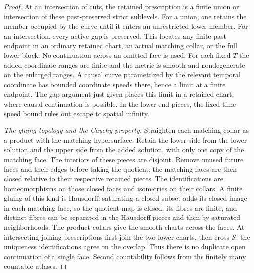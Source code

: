 \begin{proof}
At an intersection of cuts, the retained prescription is a finite
union or intersection of these past-preserved strict sublevels.
For a union, one retains the member occupied by the curve until it
enters an unrestricted lower member. For an intersection, every
active gap is preserved. This locates any finite past endpoint in
an ordinary retained chart, an actual matching collar, or the full
lower block. No continuation across an omitted face is used.
For each fixed $T$ the added coordinate ranges are finite and the
metric is smooth and nondegenerate on the enlarged ranges. A causal
curve parametrized by the relevant temporal coordinate has bounded
coordinate speeds there, hence a limit at a finite endpoint. The
gap argument just given places this limit in a retained chart,
where causal continuation is possible. In the lower end pieces,
the fixed-time speed bound rules out escape to spatial infinity.

\emph{The gluing topology and the Cauchy property.}
Straighten each matching collar as a product with the matching
hypersurface. Retain the lower side from the lower solution and the
upper side from the added solution, with only one copy of the
matching face. The interiors of these pieces are disjoint. Remove
unused future faces and their edges before taking the quotient;
the matching faces are then closed relative to their respective
retained pieces. The identifications are homeomorphisms on those
closed faces and isometries on their collars. A finite gluing of
this kind is Hausdorff: saturating a closed subset adds its closed
image in each matching face, so the quotient map is closed; its
fibres are finite, and distinct fibres can be separated in the
Hausdorff pieces and then by saturated neighborhoods. The product
collars give the smooth charts across the faces. At intersecting
joining prescriptions first join the two lower charts, then cross
$\mathcal S$; the uniqueness identifications agree on the overlap.
Thus there is no duplicate open continuation of a single face.
Second countability follows from the finitely many countable atlases.


\end{proof}
